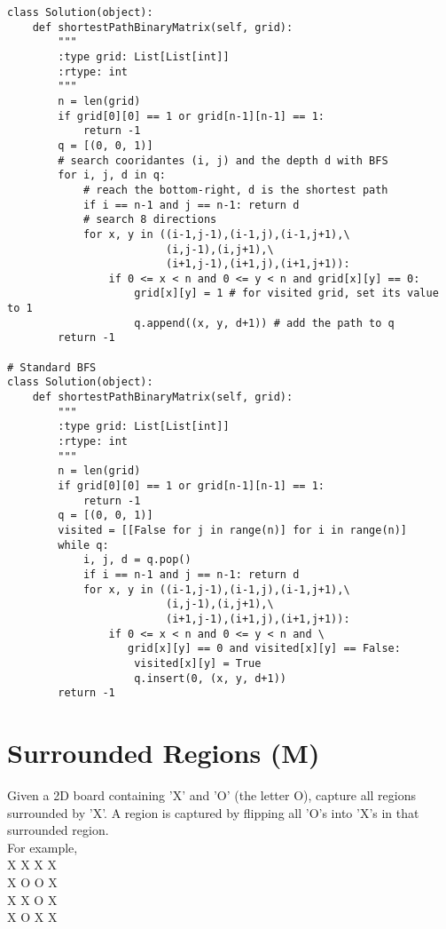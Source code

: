 \begin{lstlisting}
class Solution(object):
    def shortestPathBinaryMatrix(self, grid):
        """
        :type grid: List[List[int]]
        :rtype: int
        """
        n = len(grid)
        if grid[0][0] == 1 or grid[n-1][n-1] == 1:
            return -1
        q = [(0, 0, 1)]
        # search cooridantes (i, j) and the depth d with BFS
        for i, j, d in q:
            # reach the bottom-right, d is the shortest path
            if i == n-1 and j == n-1: return d
            # search 8 directions
            for x, y in ((i-1,j-1),(i-1,j),(i-1,j+1),\
                         (i,j-1),(i,j+1),\
                         (i+1,j-1),(i+1,j),(i+1,j+1)):
                if 0 <= x < n and 0 <= y < n and grid[x][y] == 0:
                    grid[x][y] = 1 # for visited grid, set its value to 1
                    q.append((x, y, d+1)) # add the path to q
        return -1
            
# Standard BFS
class Solution(object):
    def shortestPathBinaryMatrix(self, grid):
        """
        :type grid: List[List[int]]
        :rtype: int
        """
        n = len(grid)
        if grid[0][0] == 1 or grid[n-1][n-1] == 1:
            return -1
        q = [(0, 0, 1)]
        visited = [[False for j in range(n)] for i in range(n)]
        while q:
            i, j, d = q.pop()
            if i == n-1 and j == n-1: return d
            for x, y in ((i-1,j-1),(i-1,j),(i-1,j+1),\
                         (i,j-1),(i,j+1),\
                         (i+1,j-1),(i+1,j),(i+1,j+1)):
                if 0 <= x < n and 0 <= y < n and \
                   grid[x][y] == 0 and visited[x][y] == False:
                    visited[x][y] = True 
                    q.insert(0, (x, y, d+1)) 
        return -1
\end{lstlisting}

\section{Surrounded Regions (M)}
Given a 2D board containing 'X' and 'O' (the letter O), capture all regions surrounded by 'X'. A region is captured by flipping all 'O's into 'X's in that surrounded region.\\

For example,\\
X X X X\\
X O O X\\
X X O X\\
X O X X\\

